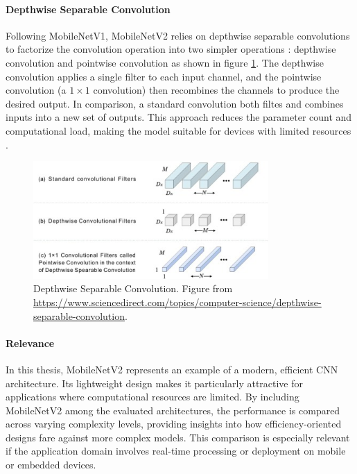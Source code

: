 \paragraph{Depthwise Separable Convolution}
Following MobileNetV1, MobileNetV2 relies on depthwise separable convolutions to factorize the convolution operation into two simpler operations \cite{howard2017mobilenetsefficientconvolutionalneural}: depthwise convolution and pointwise convolution as shown in figure \ref{fig:depthwise_sep_conv}. The depthwise convolution applies a single filter to each input channel, and the pointwise convolution (a $1\times 1$ convolution) then recombines the channels to produce the desired output. In comparison, a standard convolution both filtes and combines inputs into a new set of outputs. This approach reduces the parameter count and computational load, making the model suitable for devices with limited resources \cite{howard2017mobilenetsefficientconvolutionalneural,sandler2018mobilenetv2}.

\begin{figure}[ht]
    \centering
    \includegraphics[width=0.8\textwidth]{Images/depthwise_separable_conv.jpg} 
    \caption{Depthwise Separable Convolution. Figure from \url{https://www.sciencedirect.com/topics/computer-science/depthwise-separable-convolution}. }
    \label{fig:depthwise_sep_conv}
\end{figure}


\paragraph{Relevance}
In this thesis, MobileNetV2 represents an example of a modern, efficient CNN architecture. Its lightweight design makes it particularly attractive for applications where computational resources are limited. By including MobileNetV2 among the evaluated architectures, the performance is compared across varying complexity levels, providing insights into how efficiency-oriented designs fare against more complex models. This comparison is especially relevant if the application domain involves real-time processing or deployment on mobile or embedded devices.

